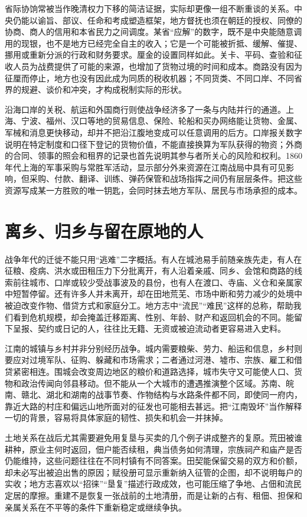 省际协饷常被当作晚清权力下移的简洁证据，实际却更像一组不断重谈的关系。中央仍能以谕旨、部议、任命和考成塑造框架，地方督抚也须在朝廷的授权、同僚的协商、商人的信用和本省民力之间调度。某省“应解”的数字，既不是中央能随意调用的现银，也不是地方已经完全自主的收入；它是一个可能被折抵、缓解、催提、挪用或重新分派的行政和财务要求。厘金的设置同样如此。关卡、平码、查验和征收人员为战费提供了可能的来源，也增加了货物过境的时间和成本。商路没有因为征厘而停止，地方也没有因此成为同质的税收机器；不同货类、不同口岸、不同省界的规避、谈价和冲突，才构成税制实际的形状。

沿海口岸的关税、航运和外国商行则使战争经济多了一条与内陆并行的通道。上海、宁波、福州、汉口等地的贸易信息、保险、轮船和买办网络能让货物、金属、军械和消息更快移动，却并不把沿江腹地变成可以任意调用的后方。口岸报关数字说明在特定制度和口径下登记的货物价值，不能直接换算为军队获得的物资；外商的合同、领事的照会和租界的记录也首先说明其参与者所关心的风险和权利。1860年代上海的军事采购与常胜军活动，显示部分外来资源在江南战局中具有可见影响，但采购、付款、翻译、训练、弹药保管和战场指挥之间仍有层层条件。把这些资源写成某一方胜败的唯一钥匙，会同时抹去地方军队、居民与市场承担的成本。

\section{离乡、归乡与留在原地的人}

战争年代的迁徙不能只用“逃难”二字概括。有人在城池易手前随亲族先走，有人在征粮、疫病、洪水或田租压力下分批离开，有人沿着亲戚、同乡、会馆和商路的线索前往城市、口岸或较少受战事波及的县份，也有人在渡口、寺庙、义仓和亲属家中短暂停留。还有许多人并未离开，却在田地荒芜、市场中断和劳力减少的处境中被迫改变作物、借贷方式和家庭分工。地方志中“流民”“难民”这样的总称，帮助我们看到危机规模，却会掩盖迁移距离、性别、年龄、财产和返回机会的不同。能留下呈报、契约或日记的人，往往比无籍、无资或被迫流动者更容易进入史料。

江南的城镇与乡村并非分别经历战争。城内需要粮柴、劳力、船运和信息，乡村则要应对过境军队、征购、躲藏和市场需求；二者通过河港、墟市、宗族、雇工和借贷紧密相连。围城会改变周边地区的粮价和道路选择，城市失守又可能使人口、货物和政治传闻向邻县移动。但不能从一个大城市的遭遇推演整个区域。苏南、皖南、赣北、湖北和湖南的战事节奏、作物结构与水路条件都不同，即使同一府内，靠近大路的村庄和偏远山地所面对的征发也可能相去甚远。把“江南毁坏”当作解释一切的背景，容易将具体家庭的韧性、损失和机会一并抹掉。

土地关系在战后尤其需要避免用复垦与买卖的几个例子讲成整齐的复原。荒田被谁耕种，原业主何时返回，佃户能否续租，典当债务如何清理，宗族祠产和庙产是否仍能维持，这些问题往往在不同村镇有不同答案。田契能保留交易的双方和价额，却未必写出被迫出售的原因；赋役册可显示重新纳入征管的企图，却不说明每户的实收；地方志喜欢以“招徕”“垦复”描述行政成效，也可能压缩了争地、占佃和流民定居的摩擦。重建不是恢复一张战前的土地清册，而是让新的占有、租佃、担保和亲属关系在不平等的条件下重新稳定或继续争执。

